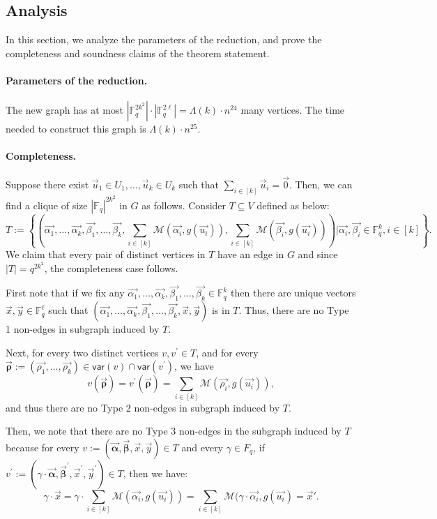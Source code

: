 \documentclass[11pt]{article}
\newcommand{\F}{\mathbb{F}}
\newcommand{\alphab}{\vec{\bm{\alpha}}}
\newcommand{\betab}{\vec{\bm{\beta}}}
\newcommand{\var}{\mathsf{var}}
\newcommand{\M}{\mathcal{M}}
\begin{document}
\subsection{Analysis}\label{sec:analysis}
In this section, we analyze the parameters of the reduction, and prove the completeness and soundness claims of the theorem statement. 


\paragraph{Parameters of the reduction.} 
The new graph has at most  $|\F_q^{2k^2}|\cdot |\F_q^{2\ell}|=\Lambda(k)\cdot n^{24}$ many vertices. The time needed to construct this graph is $\Lambda(k)\cdot n^{25}$.  

\paragraph{Completeness.} Suppose there exist $\vec{u}_1\in U_1,\ldots,\vec{u}_k\in U_k$ such that
$
\sum_{i\in[k]}\vec{u}_i=\vec{0}
$. Then, we can find a clique of size $|\F_q|^{2k^2}$ in $G$ as follows. Consider $T\subseteq V$ defined as below:
$$
T:=\left\{\left(\vec{\alpha_1},\ldots ,\vec{\alpha_{k}},\vec{\beta_1},\ldots ,\vec{\beta_{k}},\sum_{i\in[k]}\M(\vec{\alpha_i},g(\vec{u_i})),\sum_{i\in[k]}\M(\vec{\beta_i},g(\vec{u_i}))\right)\bigg| \vec{\alpha_i},\vec{\beta_i}\in\F_q^k, i\in[k]\right\}.
$$ 
We claim that every pair of distinct vertices in $T$ have an edge in $G$ and since $|T|=q^{2k^2}$, the completeness case follows.  

First note that if we fix any $\vec{\alpha_1},\ldots ,\vec{\alpha_{k}},\vec{\beta_1},\ldots ,\vec{\beta_{k}}\in \F_q^k$ then there are unique vectors $\vec{x},\vec{y}\in\F_q^\ell$ such that  $\left(\vec{\alpha_1},\ldots ,\vec{\alpha_{k}},\vec{\beta_1},\ldots ,\vec{\beta_{k}},\vec{x},\vec{y}\right)$ is in $T$. Thus, there are no Type 1 non-edges in subgraph induced by $T$.

Next, for every two distinct vertices $v,v^{\prime}\in T$, and for every $\vec{\bm{\rho}}:=(\vec{\rho_1},\ldots ,\vec{\rho_{k}})\in \var(v)\cap\var(v^{\prime})$, we have  $$
v(\vec{\bm{\rho}})=v^{\prime}(\vec{\bm{\rho}})=\sum_{i\in[k]} \M(\vec{\rho_i},g(\vec{u_i})), 
$$
and thus there are no Type 2 non-edges in subgraph induced by $T$.

Then,  we note that there are no Type 3 non-edges in the subgraph induced by $T$ because for every $v:=(\alphab,\betab,\vec{x},\vec{y})\in T$ and every $\gamma\in F_q$, if $v^\prime:=(\gamma\cdot \alphab,\betab^\prime,\vec{x}^\prime,\vec{y}^\prime)\in T$, then we have:
$$
\gamma\cdot \vec{x}=\gamma \cdot \sum_{i\in[k]}\M(\vec{\alpha_i},g(\vec{u_i})) = \sum_{i\in[k]}\M(\gamma \cdot \vec{\alpha_i},g(\vec{u_i})=\vec{x}'.
$$
\end{document}
